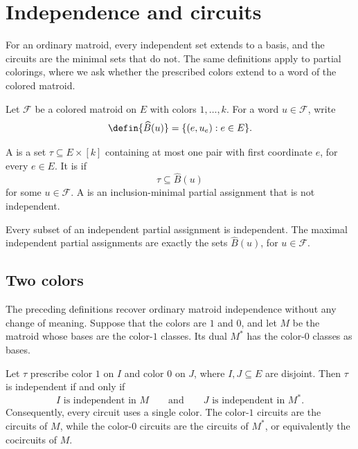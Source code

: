 
\section[independenceAndCircuits]{Independence and circuits}

For an ordinary matroid, every independent set extends to a basis, and the
circuits are the minimal sets that do not. The same definitions apply to
partial colorings, where we ask whether the prescribed colors extend to a
word of the colored matroid.

Let $\mathcal F$ be a colored matroid on $E$ with colors $1,\dotsc,k$. For a
word $u\in\mathcal F$, write
\[
 \defin{\widehat B(u)}=\{(e,u_e):e\in E\}.
\]

\begin{definition}
A  is a set
$\tau\subseteq E\times[k]$ containing at most one pair with first coordinate
$e$, for every $e\in E$. It is  if
\[
 \tau\subseteq\widehat B(u)
\]
for some $u\in\mathcal F$. A  is an inclusion-minimal partial
assignment that is not independent.
\end{definition}

Every subset of an independent partial assignment is independent. The
maximal independent partial assignments are exactly the sets
$\widehat B(u)$, for $u\in\mathcal F$.

\subsection[twoColorIndependence]{Two colors}

The preceding definitions recover ordinary matroid independence without any
change of meaning. Suppose that the colors are $1$ and $0$, and let $M$ be
the matroid whose bases are the color-$1$ classes. Its dual $M^*$ has the
color-$0$ classes as bases.

\begin{proposition}
Let $\tau$ prescribe color $1$ on $I$ and color $0$ on $J$, where
$I,J\subseteq E$ are disjoint. Then $\tau$ is independent if and only if
\[
 I\text{ is independent in }M
 \qquad\text{and}\qquad
 J\text{ is independent in }M^*.
\]
Consequently, every circuit uses a single color. The color-$1$ circuits are
the circuits of $M$, while the color-$0$ circuits are the circuits of $M^*$,
or equivalently the cocircuits of $M$.
\end{proposition}


